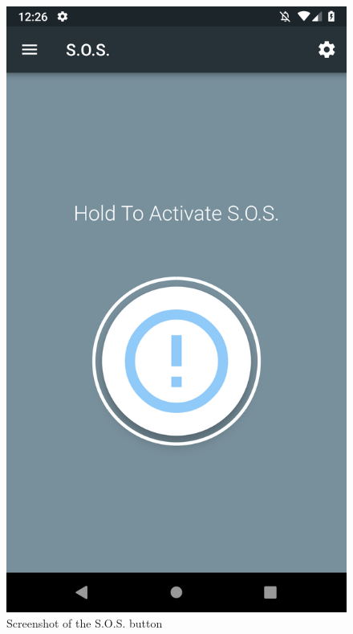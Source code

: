 \documentclass[10pt, a4paper]{article}
\begin{document}
\begin{figure}[H]
  \includegraphics[width=\linewidth]{final-diagrams/Emulator-Screenshots/Screenshot_1556126781.png}
  \caption{Screenshot of the S.O.S. button}
\endminipage
\end{figure}
\end{document}
